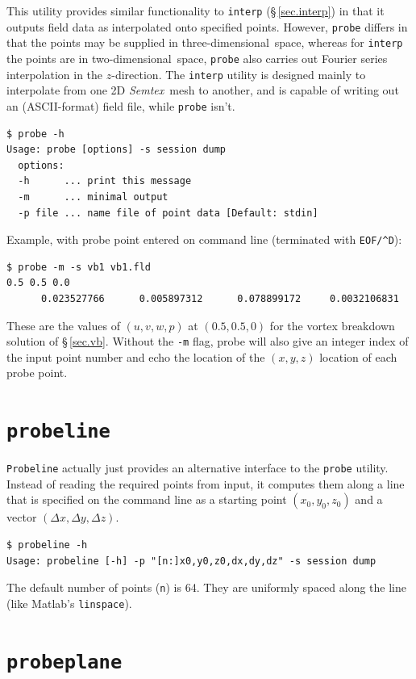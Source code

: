 \documentclass[11pt]{report}
\newcommand{\Semtex}{\emph{Semtex}} \newcommand{\Dog}{\emph{Dog}}
\newcommand\twod{two-di\-men\-sion\-al}
\newcommand\threed{three-di\-men\-sion\-al}
\begin{document}
This utility provides similar functionality to \verb|interp|
(\S\,\ref{sec.interp}) in that it outputs field data as interpolated
onto specified points.  However, \verb|probe| differs in that the
points may be supplied in \threed\ space, whereas for \verb|interp|
the points are in \twod\ space, \ie \verb|probe| also carries out
Fourier series interpolation in the $z$-direction.  The \verb|interp|
utility is designed mainly to interpolate from one 2D \Semtex\ mesh to
another, and is capable of writing out an (ASCII-format) field file,
while \verb|probe| isn't.
%
{\small
\begin{verbatim}
$ probe -h
Usage: probe [options] -s session dump
  options:
  -h      ... print this message
  -m      ... minimal output
  -p file ... name file of point data [Default: stdin]
\end{verbatim}
}
%
Example, with probe point entered on command line (terminated with
\verb|EOF/^D|):
%
{\small
\begin{verbatim}
$ probe -m -s vb1 vb1.fld
0.5 0.5 0.0
      0.023527766      0.005897312      0.078899172     0.0032106831
\end{verbatim}
}
\noindent
These are the values of $(u,v,w,p)$ at $(0.5,0.5,0)$ for the vortex
breakdown solution of \S\,\ref{sec.vb}.  Without the \verb|-m| flag,
probe will also give an integer index of the input point number and
echo the location of the $(x,y,z)$ location of each probe point.

\section{\texttt{probeline}}
\label{sec.probeline}

\verb|Probeline| actually just provides an alternative interface to
the \verb|probe| utility.  Instead of reading the required points from
input, it computes them along a line that is specified on the command
line as a starting point $(x_0,y_0,z_0)$ and a vector $(\Delta x,
\Delta y, \Delta z)$.
%
{\small
\begin{verbatim}
$ probeline -h
Usage: probeline [-h] -p "[n:]x0,y0,z0,dx,dy,dz" -s session dump
\end{verbatim}
}
%
\noindent
The default number of points (\verb|n|) is 64.  They are uniformly
spaced along the line (like Matlab's \verb|linspace|).

\section{\texttt{probeplane}}
\label{sec.probeplane}
\end{document}
